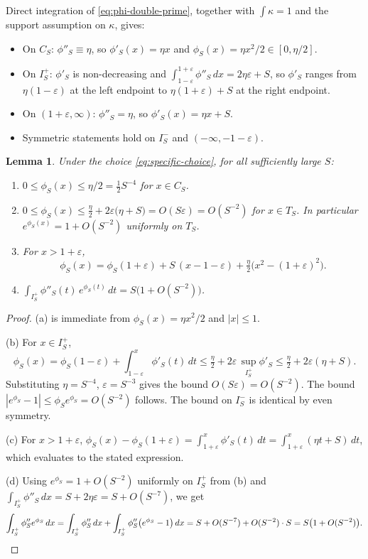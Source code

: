 \documentclass{article}
\newtheorem{lemma}[theorem]{Lemma}
\theoremstyle{remark}
\begin{document}
Direct integration of \eqref{eq:phi-double-prime}, together with
$\int\kappa=1$ and the support assumption on $\kappa$, gives:
\begin{itemize}
\item On $C_S$: $\phi''_S\equiv\eta$, so $\phi'_S(x)=\eta x$ and
  $\phi_S(x)=\eta x^2/2\in[0,\eta/2]$.
\item On $I_S^+$: $\phi'_S$ is non-decreasing and
  $\int_{1-\varepsilon}^{1+\varepsilon}\phi''_S\,dx=2\eta\varepsilon+S$, so
  $\phi'_S$ ranges from $\eta(1-\varepsilon)$ at the left endpoint to
  $\eta(1+\varepsilon)+S$ at the right endpoint.
\item On $(1+\varepsilon,\infty)$: $\phi''_S=\eta$, so
  $\phi'_S(x)=\eta x+S$.
\item Symmetric statements hold on $I_S^-$ and $(-\infty,-1-\varepsilon)$.
\end{itemize}

\begin{lemma}\label{lem:phi-bounds}
Under the choice \eqref{eq:specific-choice}, for all sufficiently large $S$:
\begin{enumerate}
\item[(a)] $0\le\phi_S(x)\le\eta/2=\tfrac{1}{2}S^{-4}$ for $x\in C_S$.
\item[(b)] $0\le\phi_S(x)\le \tfrac{\eta}{2}+2\varepsilon\bigl(\eta+S\bigr)
  =O(S\varepsilon)=O(S^{-2})$ for $x\in T_S$. In particular
  $e^{\phi_S(x)}=1+O(S^{-2})$ uniformly on $T_S$.
\item[(c)] For $x>1+\varepsilon$,
  \[
    \phi_S(x)
    =\phi_S(1+\varepsilon)
     +S\,(x-1-\varepsilon)
     +\tfrac{\eta}{2}\bigl(x^2-(1+\varepsilon)^2\bigr).
  \]
\item[(d)] $\displaystyle\int_{I_S^+}\phi''_S(t)\,e^{\phi_S(t)}\,dt
  =S\bigl(1+O(S^{-2})\bigr)$.
\end{enumerate}
\end{lemma}

\begin{proof}
(a) is immediate from $\phi_S(x)=\eta x^2/2$ and $|x|\le 1$.

(b) For $x\in I_S^+$,
\[
  \phi_S(x)=\phi_S(1-\varepsilon)+\int_{1-\varepsilon}^x\phi'_S(t)\,dt
  \le \tfrac{\eta}{2}+2\varepsilon\,\sup_{I_S^+}\phi'_S
  \le \tfrac{\eta}{2}+2\varepsilon(\eta+S).
\]
Substituting $\eta=S^{-4}$, $\varepsilon=S^{-3}$ gives the bound
$O(S\varepsilon)=O(S^{-2})$. The bound $|e^{\phi_S}-1|\le \phi_S e^{\phi_S}
=O(S^{-2})$ follows. The bound on $I_S^-$ is identical by even symmetry.

(c) For $x>1+\varepsilon$, $\phi_S(x)-\phi_S(1+\varepsilon)
=\int_{1+\varepsilon}^x\phi'_S(t)\,dt=\int_{1+\varepsilon}^x(\eta t+S)\,dt$,
which evaluates to the stated expression.

(d) Using $e^{\phi_S}=1+O(S^{-2})$ uniformly on $I_S^+$ from (b) and
$\int_{I_S^+}\phi''_S\,dx=S+2\eta\varepsilon=S+O(S^{-7})$, we get
\[
  \int_{I_S^+}\phi''_S e^{\phi_S}\,dx
  =\int_{I_S^+}\phi''_S\,dx+\int_{I_S^+}\phi''_S\bigl(e^{\phi_S}-1\bigr)\,dx
  = S+O(S^{-7})+O(S^{-2})\cdot S
  = S\bigl(1+O(S^{-2})\bigr).\qedhere
\]
\end{proof}
\end{document}
